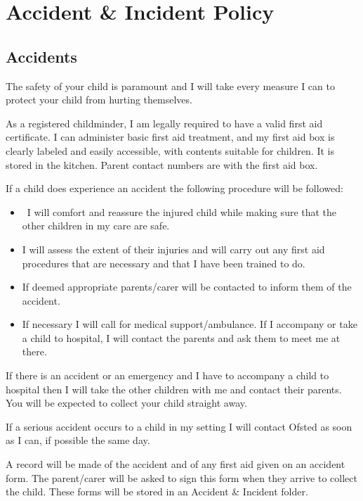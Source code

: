 

\section{Accident \& Incident Policy}

\subsection{Accidents}

The safety of your child is paramount and I will take every measure I
can to protect your child from hurting themselves.

As a registered childminder, I am legally required to have a valid first
aid certificate. I can administer basic first aid treatment, and my
first aid box is clearly labeled and easily accessible, with contents
suitable for children. It is stored in the kitchen. Parent contact
numbers are with the first aid box.

If a child does experience an accident the following procedure will be
followed:

\begin{itemize}
\item
  ~I will comfort and reassure the injured child while making sure that
  the other children in my care are safe.~
\item
  I will assess the extent of their injuries and will carry out any
  first aid procedures that are necessary and that I have been trained
  to do.~
\item
  If deemed appropriate parents/carer will be contacted to inform them
  of the accident.~
\item
  If necessary I will call for medical support/ambulance. If I
  accompany or take a child to hospital, I will contact the parents and
  ask them to meet me at there.~
\end{itemize}

If there is an accident or an emergency and I have to accompany a child
to hospital then I will take the other children with me and contact
their parents. You will be expected to collect your child straight away.

If a serious accident occurs to a child in my setting I will contact
Ofsted as soon as I can, if possible the same day.

A record will be made of the accident and of any first aid given on an
accident form. The parent/carer will be asked to sign this form when
they arrive to collect the child. These forms will be stored in an
Accident \& Incident folder.

